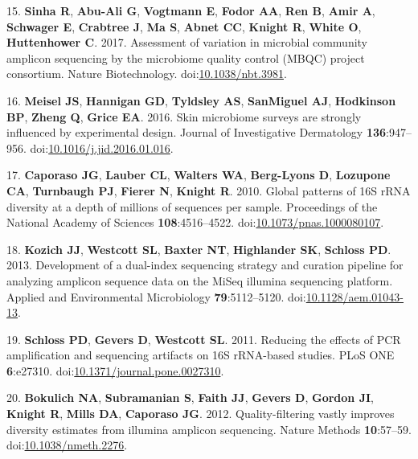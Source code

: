 \documentclass[11pt,]{article}
\begin{document}
\hypertarget{ref-Sinha2017}{}
15. \textbf{Sinha R}, \textbf{Abu-Ali G}, \textbf{Vogtmann E},
\textbf{Fodor AA}, \textbf{Ren B}, \textbf{Amir A}, \textbf{Schwager E},
\textbf{Crabtree J}, \textbf{Ma S}, \textbf{Abnet CC}, \textbf{Knight
R}, \textbf{White O}, \textbf{Huttenhower C}. 2017. Assessment of
variation in microbial community amplicon sequencing by the microbiome
quality control (MBQC) project consortium. Nature Biotechnology.
doi:\href{https://doi.org/10.1038/nbt.3981}{10.1038/nbt.3981}.

\hypertarget{ref-Meisel2016}{}
16. \textbf{Meisel JS}, \textbf{Hannigan GD}, \textbf{Tyldsley AS},
\textbf{SanMiguel AJ}, \textbf{Hodkinson BP}, \textbf{Zheng Q},
\textbf{Grice EA}. 2016. Skin microbiome surveys are strongly influenced
by experimental design. Journal of Investigative Dermatology
\textbf{136}:947--956.
doi:\href{https://doi.org/10.1016/j.jid.2016.01.016}{10.1016/j.jid.2016.01.016}.

\hypertarget{ref-Caporaso2010}{}
17. \textbf{Caporaso JG}, \textbf{Lauber CL}, \textbf{Walters WA},
\textbf{Berg-Lyons D}, \textbf{Lozupone CA}, \textbf{Turnbaugh PJ},
\textbf{Fierer N}, \textbf{Knight R}. 2010. Global patterns of 16S rRNA
diversity at a depth of millions of sequences per sample. Proceedings of
the National Academy of Sciences \textbf{108}:4516--4522.
doi:\href{https://doi.org/10.1073/pnas.1000080107}{10.1073/pnas.1000080107}.

\hypertarget{ref-Kozich2013}{}
18. \textbf{Kozich JJ}, \textbf{Westcott SL}, \textbf{Baxter NT},
\textbf{Highlander SK}, \textbf{Schloss PD}. 2013. Development of a
dual-index sequencing strategy and curation pipeline for analyzing
amplicon sequence data on the MiSeq illumina sequencing platform.
Applied and Environmental Microbiology \textbf{79}:5112--5120.
doi:\href{https://doi.org/10.1128/aem.01043-13}{10.1128/aem.01043-13}.

\hypertarget{ref-Schloss2011}{}
19. \textbf{Schloss PD}, \textbf{Gevers D}, \textbf{Westcott SL}. 2011.
Reducing the effects of PCR amplification and sequencing artifacts on
16S rRNA-based studies. PLoS ONE \textbf{6}:e27310.
doi:\href{https://doi.org/10.1371/journal.pone.0027310}{10.1371/journal.pone.0027310}.

\hypertarget{ref-Bokulich2012}{}
20. \textbf{Bokulich NA}, \textbf{Subramanian S}, \textbf{Faith JJ},
\textbf{Gevers D}, \textbf{Gordon JI}, \textbf{Knight R}, \textbf{Mills
DA}, \textbf{Caporaso JG}. 2012. Quality-filtering vastly improves
diversity estimates from illumina amplicon sequencing. Nature Methods
\textbf{10}:57--59.
doi:\href{https://doi.org/10.1038/nmeth.2276}{10.1038/nmeth.2276}.
\end{document}
